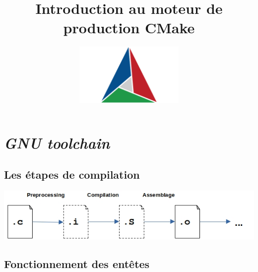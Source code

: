 \documentclass{beamer}
\title{Introduction au moteur de production CMake}
\author{
   \includegraphics[height=3cm]{CMake_Logo.png}
}
\newenvironment{Frame}{\begin{frame}[containsverbatim]{\subsecname}}{\end{frame}}
\newcommand{\PrintSnippet}[5]{
    \ifthenelse{\isempty{#5}}
    {
        
    }
    {
        
    }
}
\newcommand{\SectionFrame}[0]{
    \begin{frame}
        \centering
        \Large
        \textbf{\secname}
    \end{frame}
}
\begin{document}
\begin{frame}
    \maketitle
\end{frame}

\begin{frame}
    \tiny
    \tableofcontents
\end{frame}

\section{\textit{GNU toolchain}}

\SectionFrame

\subsection{Les étapes de compilation}

\begin{Frame}
    \PrintSnippet{C}{Fichier source (\texttt{main.c})}{main.c}{}{}
\end{Frame}

\begin{Frame}
    \PrintSnippet{C}{Après l'étape de \textit{preprocessing} (\texttt{main.i})}{main.i}{}{}
\end{Frame}

\begin{Frame}
    \small
    \PrintSnippet{C}{Après compilation (\texttt{main.S})}{main.S}{5}{18}
\end{Frame}

\begin{Frame}
    \PrintSnippet{C}{Après assemblage  (\texttt{main.o})}{main_dump.txt}{}{}
\end{Frame}

\begin{Frame}
    \includegraphics[width=\textwidth]{compilation_to_obj.jpg}
\end{Frame}

\subsection{Fonctionnement des entêtes}
\end{document}
